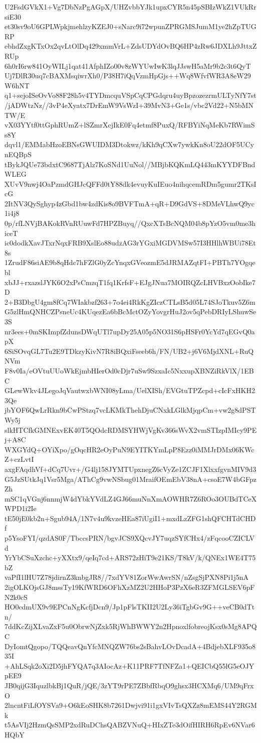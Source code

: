 U2FsdGVkX1+Vg7DbNzPgAGpX/UHZvbbYJk1upxCYR5n45pSBIzWkZ1VUkRrsiE30
et30sv9oU6GPLWpkjmehlzyKZEJ0+sNarc9i72wpunZPRGMSJumM1ye2hZpTUGRP
ebhdZxgKTxOx2qvLtOlDq429xmmVrL+ZdsUDYdOvBQ6HP4zRw6JDXLh9JttxZRUp
6h0rI6rw841OyWILj1qat41AfphIZo00v8zWYUwIwK3lqJJswH5aMr9b2c3t6QyT
Uj7DlR30uq7cBAXMsqiwrXh0/P38H7iQqVzmHpGjs++Wq8WfvfWR3A8eW29W6hNT
q1+sejoISeOvVo88F28h5v4TYDmcquVSpCqCPGdqru4uyBpzozezrmULTyNfY7st
/jADWtzNz//3vP4eXyatx7DrEmW9VsWzI+39MvN3+Ge1s/vbc2Vd22+N5bMNTW/E
vX03YYtf0ttGphRUmZ+lSZmrXcjIkE0Fq4etmf8PuxQ/RFBYiNqMeKb7RWimSs8Y
dqvl1/EMMabHzoEBNsGWUIDM3Dtokwz/kKh9qCXw7ywkKn8oU22dOF5UCynEQBpS
tBykJQUe73bdxtC9687TjAlz7KoSNd1UuNol//MBjbKQKmLQ443mKYYDFBndWLEG
XUvV9nwj4OaPzmdGHJcQFFd0tY88dk4evuyKuIEuo4nihqcemRDm5gumr2TKsIcG
2ItNV3QySghyp4zGbd1bw4zdKis8o9BVFTmA+qR+D9GdVS+8DMeVLhwQ9yc1i4j8
0p/rfLNVjBAKokRVnRUuwFd7HPZBuyq//QxcXTsBcNQM04b8pYzO5vm0me3hiceT
ic0dodkXavJTxrNqxFRB9XslEo88udzAG3rYGxiMGDVMSw57I3HHlhWBUi78Et8s
1ZrudF86siAE9b8qHdc7hFZlG0yZcYnqxGVeozmE5dJRMAZqtFI+PBTh7YOgqebl
xbJJ+rxazslJYK6O2xPsCmzqT1fq1KrfsF+EJgJNua7MOIRQZcLHVBxzOobIke7D
2+B3DbgU4gm8fCq7WIakbzf263+7o4ei4RkKgZIczCTLsB5d05L74SJoTkuv5Z6m
G5zlHmQNHCZPsneUc4KUqezEa6bBcMctOZyYovgrHuJ2ov5qPebDRIyLShuwSe3S
nr3ees+0mSKImpfZdunsDWqUTl7upDy25A05p5NO31S6pHSFr0YcYd7qEGvQ0apX
6SiSOvqGL7Tu2E9TDkzyKivN7R8iBQxiFseeb6h/FN/UB2+j6V6MjdXNL+RuQNVm
F8v0Ia/eOVtuUUoWkEjmbHIerOd0cDjr7uSw9SzxaIc5NxxupXBNZiRkVlX/1EBC
GLewWkv4JLegoJqVautwxbWNI08yLma/UelXISh/EVGtuTPZcpd+cIcFxHKH23Qe
jbYOF6QwLrRkn9bCwPStzq7vcLKMkThehDjuCNxkLGlkMjqpCm+vw2g8dPSTWy5j
slkHTCfkGMNExvEK40T5QOdcRDMSYHWjVgKv366sWvX2vmSTIzpIMIcy9PEj+A8C
WXGYdQ+OYiXpo/gOqcHR2eOyPuN9EYITKYmLpP8Ezz0iMMJrDMx06KWcZ+czLvtI
axgFAqdhVf+dCq7Uvr+/G4lj158JYMTUpxnegZ6cVyZe1ZCJF1XlxxfgvnMIV9d3
G5JzSUtkJq1Vsr5Mga/AThCg9vwNSbug01MraifOEmEbV38nA+csoE7W4bGFpzZh
mSC1qVGnj6nnmjW4dYbkYVdLZ4GJ66muNnXmAOWHR7Z6ROo3OUBdTCeXWPD1i2Ie
tE50jE0kb2n+Sgub94A/1N7v4u9kvzeHEa87iUgiI1+mxdLzZFG1shQFCHTdCHDf
p5YsoFYI/qzdAS0F/TbccsPRN/bgvJCS9XQcvJY7uqzSYfCHx4/zFqcooCZICLVd
YrYbCSuXzchc+yXXtx9/qeIq7cd+ARS72zHiT9e21KS/T8kV/k/QNEx1WE4T75bZ
vaPfI1lHU7Z78jdirnZ3knbgJR8//7xdYV81ZorWwAwrSN/nZsgSjPXN8Pi1j5nA
2igOLKOjsGJ8mssTy19KfWRD6OFhXzMZ2U2HHoP3PzX6eR3ZFMGLSEV6pFN2k0cS
HO0cdmUX9v9EPCnNgKcfjDcn9/Jp1pFlsTKII2U2Ly36iTgbGv9G++veCB0dTtn/
7ddKcZijXLvaZxF5u0ObrwNjZxk5RjWhBWWY2n2HpnoxlfobreojKsx0sMg8APQC
DyIomtQgopo/TQQeavQnYfcMNQZW76bs2sBahvLOvDcadA+4BdjebXLF935o835I
+AhLSqk2oXi2D5jhFYQA7q3AIocAz+K11PRF7TfNFZa1+QEICbQ55lG5eOJYpEE9
JB0qijG3IquzlbkBj1QuR/jQE/3zYT9rPE7ZBbfRbqO9ghsx3HCXMq6/UM9qFrxO
2lncntFiLfOYSVa9+O6kEoSHK8b7261Dwjvi91i1gxVIvTsQXZz8mEMS44Y2RGMk
t5AsVIj2HzmQsSMP2xdRuDChsQABZVNuQ+HIxZTe3dOifHIRH6RpEv6NVar6HQbY
